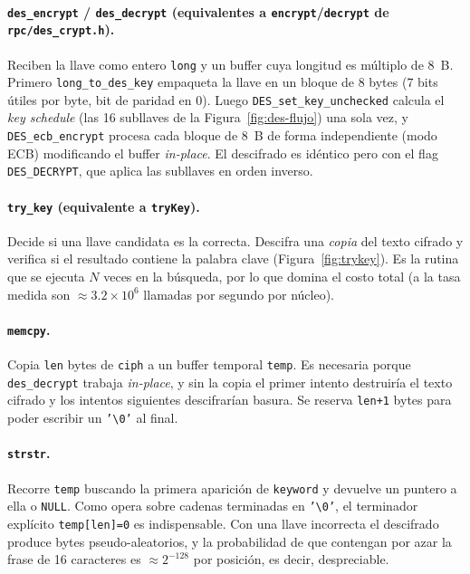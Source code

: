 \documentclass[11pt,letterpaper]{article}
\begin{document}
\paragraph{\texttt{des\_encrypt} / \texttt{des\_decrypt} (equivalentes a \texttt{encrypt}/\texttt{decrypt} de \texttt{rpc/des\_crypt.h}).}
Reciben la llave como entero \texttt{long} y un buffer cuya longitud es
múltiplo de 8~B. Primero \texttt{long\_to\_des\_key} empaqueta la llave
en un bloque de 8 bytes (7 bits útiles por byte, bit de paridad en 0).
Luego \texttt{DES\_set\_key\_unchecked} calcula el \textit{key schedule}
(las 16 subllaves de la Figura~\ref{fig:des-flujo}) una sola vez, y
\texttt{DES\_ecb\_encrypt} procesa cada bloque de 8~B de forma
independiente (modo ECB) modificando el buffer \textit{in-place}. El
descifrado es idéntico pero con el flag \texttt{DES\_DECRYPT}, que
aplica las subllaves en orden inverso.

\paragraph{\texttt{try\_key} (equivalente a \texttt{tryKey}).}
Decide si una llave candidata es la correcta. Descifra una \textit{copia}
del texto cifrado y verifica si el resultado contiene la palabra clave
(Figura~\ref{fig:trykey}). Es la rutina que se ejecuta $N$ veces en la
búsqueda, por lo que domina el costo total (a la tasa medida son
$\approx 3.2\times10^{6}$ llamadas por segundo por núcleo).

\paragraph{\texttt{memcpy}.}
Copia \texttt{len} bytes de \texttt{ciph} a un buffer temporal
\texttt{temp}. Es necesaria porque \texttt{des\_decrypt} trabaja
\textit{in-place}, y sin la copia el primer intento destruiría el texto
cifrado y los intentos siguientes descifrarían basura. Se reserva
\texttt{len+1} bytes para poder escribir un \texttt{'\textbackslash0'} al final.

\paragraph{\texttt{strstr}.}
Recorre \texttt{temp} buscando la primera aparición de \texttt{keyword}
y devuelve un puntero a ella o \texttt{NULL}. Como opera sobre cadenas
terminadas en \texttt{'\textbackslash0'}, el terminador explícito
\texttt{temp[len]=0} es indispensable. Con una llave incorrecta el
descifrado produce bytes pseudo-aleatorios, y la probabilidad de que
contengan por azar la frase de 16 caracteres es $\approx 2^{-128}$ por
posición, es decir, despreciable.
\end{document}
